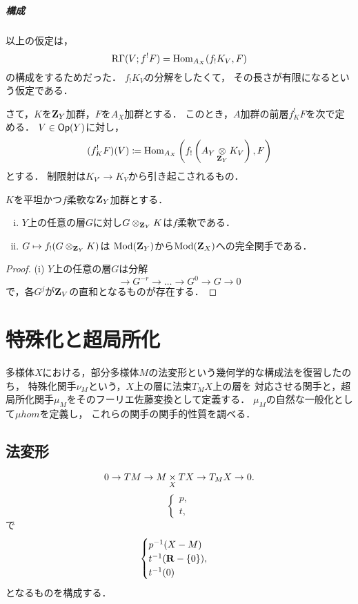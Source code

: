 \paragraph{構成}
以上の仮定は，
\[
    \RG(V;f^!{F})
    =\Hom_{A_X}({f_!}K_V,F)
\]
の構成をするためだった．
\(f_!K_V\)の分解をしたくて，
その長さが有限になるという仮定である．

さて，\(K\)を\(\zz_Y\)加群，\(F\)を\(A_X\)加群とする．
このとき，\(A\)加群の前層\(f^!_KF\)を次で定める．
\(V\in\Op(Y)\)に対し，
\[
    (f^!_KF)(V)
    \coloneqq
    \Hom_{A_X}\left(f_!\left(
        A_Y\mathop{\otimes}\limits_{\zz_Y}K_V
    \right),F\right)
\]
とする．
制限射は\(K_{V'}\to{K_V}\)から引き起こされるもの．

\begin{LMM}
    \(K\)を平坦かつ\(f\)柔軟な\(\zz_Y\)加群とする．
    \begin{enumerate}[(i)]
        \item \(Y\)上の任意の層\(G\)に対し\(G\otimes_{\zz_Y}K\)は\(f\)柔軟である．
        \item \(G\mapsto f_!(G\otimes_{\zz_Y}K)\)は
        \(\Mod(\zz_Y)\)から\(\Mod(\zz_X)\)への完全関手である．
    \end{enumerate}
\end{LMM}
\begin{proof}
    (i) 
    \(Y\)上の任意の層\(G\)は分解
    \[
        \to{G^{-r}}\to\dots\to{G^{0}}\to{G}\to0
    \]
    で，各\(G^{j}\)が\(\zz_V\)の直和となるものが存在する．
\end{proof}




\chapter{特殊化と超局所化}
多様体\(X\)における，部分多様体\(M\)の法変形という幾何学的な構成法を復習したのち，
特殊化関手\(\nu_M\)という，\(X\)上の層に法束\(T_MX\)上の層を
対応させる関手と，超局所化関手\(\mu_M\)をそのフーリエ佐藤変換として定義する．
\(\mu_M\)の自然な一般化として\(\mu hom\)を定義し，
これらの関手の関手的性質を調べる．

\section{法変形}
\begin{equation}
    0\to TM\to M\pb[X]TX\to T_{M}X\to0.
\end{equation}
\begin{equation}
    \begin{cases}
        p,\\
        t,
    \end{cases}
\end{equation}
で
\begin{equation}
    \begin{cases}
        p^{-1}(X-M)\\
        t^{-1}(\rr-\{0\}),\\
        t^{-1}(0)
    \end{cases}
\end{equation}
となるものを構成する．

